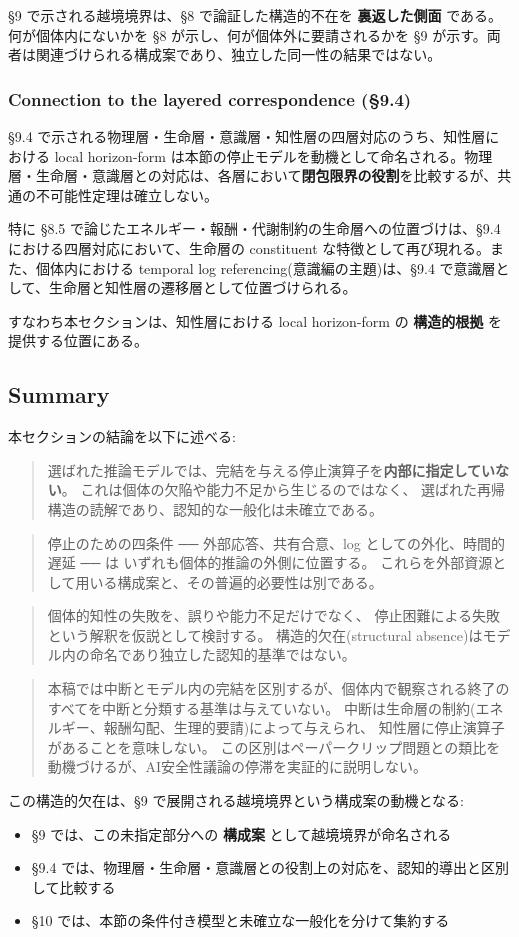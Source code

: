 \S{}9 で示される越境境界は、\S{}8 で論証した構造的不在を \textbf{裏返した側面} である。何が個体内にないかを \S{}8 が示し、何が個体外に要請されるかを \S{}9 が示す。両者は関連づけられる構成案であり、独立した同一性の結果ではない。

\subsubsection{Connection to the layered correspondence (\S{}9.4)}


\S{}9.4 で示される物理層・生命層・意識層・知性層の四層対応のうち、知性層における local horizon-form は本節の停止モデルを動機として命名される。物理層・生命層・意識層との対応は、各層において\textbf{閉包限界の役割}を比較するが、共通の不可能性定理は確立しない。

特に \S{}8.5 で論じたエネルギー・報酬・代謝制約の生命層への位置づけは、\S{}9.4 における四層対応において、生命層の constituent な特徴として再び現れる。また、個体内における temporal log referencing(意識編の主題)は、\S{}9.4 で意識層として、生命層と知性層の遷移層として位置づけられる。

すなわち本セクションは、知性層における local horizon-form の \textbf{構造的根拠} を提供する位置にある。

\subsection{Summary}


本セクションの結論を以下に述べる:

\begin{quote}
選ばれた推論モデルでは、完結を与える停止演算子を\textbf{内部に指定していない}。
これは個体の欠陥や能力不足から生じるのではなく、
選ばれた再帰構造の読解であり、認知的な一般化は未確立である。
\end{quote}

\begin{quote}
停止のための四条件 ── 外部応答、共有合意、log としての外化、時間的遅延 ── は
いずれも個体的推論の外側に位置する。
これらを外部資源として用いる構成案と、その普遍的必要性は別である。
\end{quote}

\begin{quote}
個体的知性の失敗を、誤りや能力不足だけでなく、
停止困難による失敗という解釈を仮説として検討する。
構造的欠在(structural absence)はモデル内の命名であり独立した認知的基準ではない。
\end{quote}

\begin{quote}
本稿では中断とモデル内の完結を区別するが、個体内で観察される終了のすべてを中断と分類する基準は与えていない。
中断は生命層の制約(エネルギー、報酬勾配、生理的要請)によって与えられ、
知性層に停止演算子があることを意味しない。
この区別はペーパークリップ問題との類比を動機づけるが、AI安全性議論の停滞を実証的に説明しない。
\end{quote}

この構造的欠在は、\S{}9 で展開される越境境界という構成案の動機となる:

\begin{itemize}
\item \S{}9 では、この未指定部分への \textbf{構成案} として越境境界が命名される
\item \S{}9.4 では、物理層・生命層・意識層との役割上の対応を、認知的導出と区別して比較する
\item \S{}10 では、本節の条件付き模型と未確立な一般化を分けて集約する
\end{itemize}
